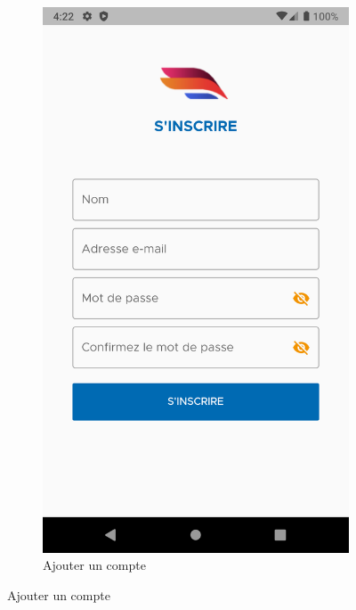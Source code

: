 \begin{itemize}[label=$\ast$]
\begin{figure}
\begin{subfigure}{0.3\textwidth}
		\includegraphics[width=\hsize, valign=m ]{./Template LaTeX/Images/From_emu/A_add_s.png}
		\caption{Ajouter un compte}
		\label{fig.SICAPI}
	\end{subfigure}
	

\end{figure}
\end{itemize}
